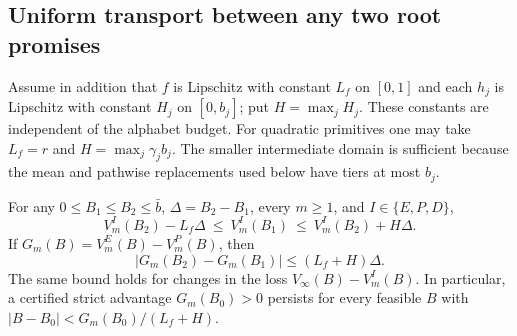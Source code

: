 \subsection{Uniform transport between any two root promises}
Assume in addition that $f$ is Lipschitz with constant $L_f$ on $[0,1]$ and each $h_j$ is Lipschitz with constant $H_j$ on $[0,b_j]$; put $H=\max_jH_j$. These constants are independent of the alphabet budget. For quadratic primitives one may take $L_f=r$ and $H=\max_j\gamma_jb_j$. The smaller intermediate domain is sufficient because the mean and pathwise replacements used below have tiers at most $b_j$.
\begin{theorem}\label{thm:stability}
For any $0\leq B_1\leq B_2\leq\bar b$, $\Delta=B_2-B_1$, every $m\geq1$, and $I\in\{E,P,D\}$,
\begin{equation}\label{eq:value-stability}
 V_m^I(B_2)-L_f\Delta\ \leq\ V_m^I(B_1)\ \leq\ V_m^I(B_2)+H\Delta.
\end{equation}
If $G_m(B)=V_m^E(B)-V_m^P(B)$, then
\begin{equation}\label{eq:gap-stability}
 |G_m(B_2)-G_m(B_1)|\leq(L_f+H)\Delta.
\end{equation}
The same bound holds for changes in the loss $V_\infty(B)-V_m^I(B)$. In particular, a certified strict advantage $G_m(B_0)>0$ persists for every feasible $B$ with $|B-B_0|<G_m(B_0)/(L_f+H)$.
\end{theorem}
